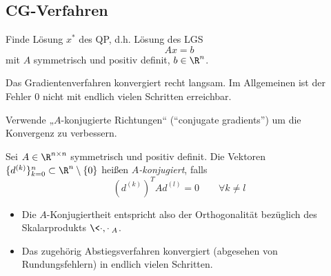 \documentclass[11pt]{scrbook}
\begin{document}
\subsection{CG-Verfahren}


Finde Lösung $x^*$ des QP, d.h. Lösung des LGS
\[
	Ax = b
\]
mit $A$ symmetrisch und positiv definit, $b \in \R^n$.

Das Gradientenverfahren konvergiert recht langsam.
Im Allgemeinen ist der Fehler $0$ nicht mit endlich vielen Schritten erreichbar.

Verwende „$A$-konjugierte Richtungen“ (“conjugate gradients”) um die Konvergenz zu verbessern.

\begin{df} \label{4.16}
	Sei $A \in \R^{n\times n}$ symmetrisch und positiv definit.
	Die Vektoren $\{d^{(k)}\}_{k=0}^n \subset \R^n \setminus \{0\}$ heißen \emph{$A$-konjugiert}, falls
	\[
		(d^{(k)})^T A d^{(l)} = 0
		\qquad 
		\forall k \neq l
	\]
	\begin{note}
		\begin{itemize}
			\item
				Die $A$-Konjugiertheit entspricht also der Orthogonalität bezüglich des Skalarprodukts $\<\cdot, \cdot\>_A$.
			\item
				Das zugehörig Abstiegsverfahren konvergiert (abgesehen von Rundungsfehlern) in endlich vielen Schritten.

		\end{itemize}
	\end{note}
\end{df}
\end{document}
